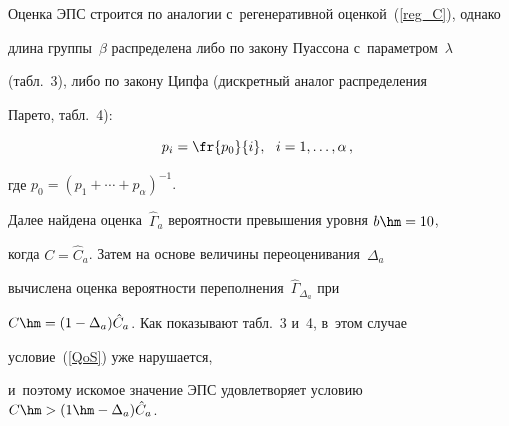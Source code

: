 Оценка ЭПС строится по аналогии  с~регенеративной оценкой~(\ref{reg_C}), однако  


длина  группы~$\beta$  распределена либо  по закону Пуассона с~параметром~$\lambda$ 


(табл.~3), либо  по закону Ципфа (дискретный аналог  распределения 


Парето, табл.~4):


\begin{equation}


p_i=\fr{p_0}{i},\, \enskip i=1, \ldots, \alpha\,,\ 


\label{18}


\end{equation}


где  $p_0=(p_1+\cdots+p_{\alpha})^{-1}.$





Далее  найдена  оценка~$\hat{\Gamma}_a$  вероятности превышения  уровня $b\hm=10$, 


когда  $C=\hat{C}_a$. Затем на основе величины переоценивания~${\Delta}_{a}$ 


вычислена    оценка вероятности переполнения~${\hat\Gamma}_{{\Delta}_a}$  при   


$C \hm= (1-{\Delta}_a)\hat{C}_a$. Как показывают табл.~3 и~4, в~этом случае 


условие~(\ref{QoS}) уже  нарушается,


и~поэтому  искомое  значение ЭПС удовлетворяет условию $C \hm> (1\hm- {\Delta}_a)\hat{C}_a$.


